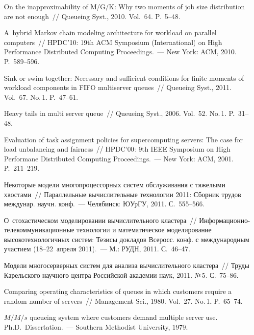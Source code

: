 \begin{multicols}{2}
{{\begin{thebibliography}{99}
On the inapproximability of M/G/K: Why two moments of job size distribution are not enough~// 
Queueing Syst., 2010. Vol.~64. P.~5--48.

A~hybrid Markov chain modeling architecture for workload on parallel computers~// 
HPDC'10: 19th ACM  Symposium (International) on High Performance Distributed Computing
Proceedings.~--- New York: ACM, 2010. P.~589--596.

Sink or swim together: Necessary and sufficient conditions for finite moments of workload components in FIFO 
multiserver queues~// Queueing Syst., 2011. Vol.~67. No.\,1. P.~47--61.

Heavy tails in multi server queue~// Queueing Syst., 2006. Vol.~52. No.\,1. P.~31--48.

Evaluation of task assignment policies for supercomputing servers: The 
case for load unbalancing and fairness~// HPDC'00: 9th IEEE Symposium on High 
Performane Distributed Computing Proceedings.~--- New York: ACM, 2001.
P.~211--219.

Некоторые модели многопроцессорных систем обслуживания с тяжелыми хвостами~// 
Параллельные вычислительные технологии 2011: Сборник трудов междунар. научн. конф.~--- 
Челябинск: ЮУрГУ, 2011. С.~555--566.

О~стохастическом моделировании вычислительного кластера~// 
Ин\-фор\-ма\-ци\-он\-но-те\-ле\-ком\-му\-ни\-ка\-ци\-он\-ные 
технологии и математическое моделирование высокотехнологичных систем: 
Тезисы докладов Всеросс. конф. с международным учас\-ти\-ем (18--22~апреля 2011).~--- 
М.: РУДН, 2011. С.~46--47.

Модели многосерверных систем для анализа вычислительного кластера~// 
Труды Карельского научного центра Российской академии наук, 2011. №\,5. С.~75--86.

Comparing operating characteristics of queues in which customers require a random number of servers~// 
Management Sci., 1980. Vol.~27. No.\,1. P.~65--74.

 $M/M/s$ queueing system where customers demand multiple server use. 
Ph.D.\ Dissertation.~--- Southern Methodist University, 1979.


\end{thebibliography}}}
\end{multicols}
